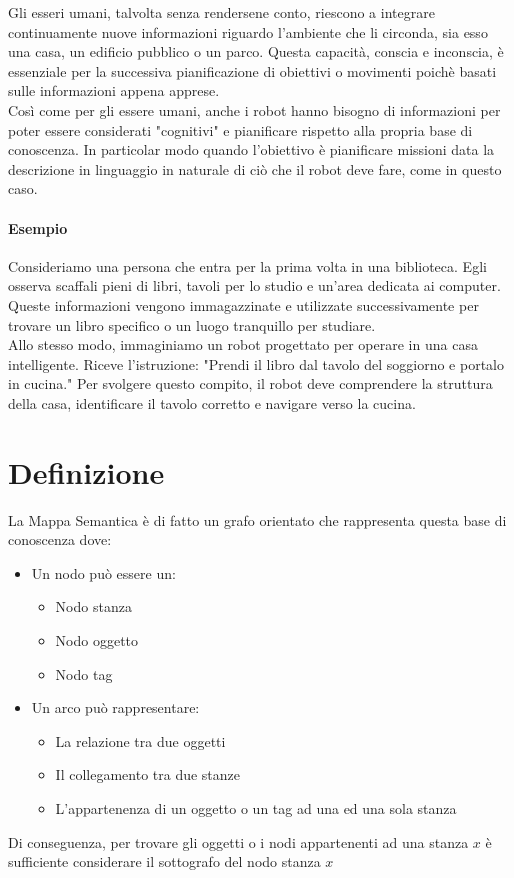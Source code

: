Gli esseri umani, talvolta senza rendersene conto, riescono a integrare continuamente nuove informazioni riguardo l'ambiente che li circonda, sia esso una casa, un edificio pubblico o un parco. Questa capacità, conscia e inconscia, è essenziale per la successiva pianificazione di  obiettivi o movimenti poichè basati sulle informazioni appena apprese. \\
Così come per gli essere umani, anche i robot hanno bisogno di informazioni per poter essere considerati "cognitivi" e pianificare rispetto alla propria base di conoscenza. In particolar modo quando l'obiettivo è pianificare missioni data la descrizione in linguaggio in naturale di ciò che il robot deve fare, come in questo caso.

\paragraph*{Esempio}
Consideriamo una persona che entra per la prima volta in una biblioteca. Egli osserva scaffali pieni di libri, tavoli per lo studio e un'area dedicata ai computer. Queste informazioni vengono immagazzinate e utilizzate successivamente per trovare un libro specifico o un luogo tranquillo per studiare.\\
Allo stesso modo, immaginiamo un robot progettato per operare in una casa intelligente. Riceve l'istruzione: "Prendi il libro dal tavolo del soggiorno e portalo in cucina." Per svolgere questo compito, il robot deve comprendere la struttura della casa, identificare il tavolo corretto e navigare verso la cucina.

\section{Definizione}
La Mappa Semantica è di fatto un grafo orientato che rappresenta questa base di conoscenza dove:
\begin{itemize}
  \item Un nodo può essere un:
  \begin{itemize}
    \item Nodo stanza
    \item Nodo oggetto
    \item Nodo tag
  \end{itemize}
  \item Un arco può rappresentare:
  \begin{itemize}
    \item La relazione tra due oggetti
    \item Il collegamento tra due stanze
    \item L'appartenenza di un oggetto o un tag ad una ed una sola stanza
  \end{itemize}
\end{itemize}
Di conseguenza, per trovare gli oggetti o i nodi appartenenti ad una stanza $x$ è sufficiente considerare il sottografo del nodo stanza $x$

